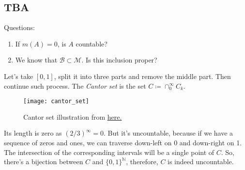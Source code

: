 \subsection{TBA}

Questions:
\begin{enumerate}
    \item {
        If $m(A) = 0$, is $A$ countable?
    }
    \item {
        We know that $\mathcal{B} \subset \mathcal{M}$. Is this inclusion proper?
    }
\end{enumerate}

\begin{definition}
    Let's take $[0, 1]$, split it into three parts and remove the middle part.
    Then continue such process.
    The \textit{Cantor set} is the set $C \coloneqq \cap_0^\infty C_k$.
\end{definition}

\begin{figure*}[h]
    \centering
    \texttt{[image: cantor\_set]}
    \caption*{Cantor set illustration from \href{http://tasks.illustrativemathematics.org/content-standards/tasks/929}{here.}}
\end{figure*}

\begin{remark}
    Its length is zero as $(2/3)^\infty = 0$. But it's uncountable,
    because if we have a sequence of zeros and ones, we can traverse 
    down-left on 0 and down-right on 1. The intersection of the corresponding
    intervals will be a single point of $C$. So, there's a bijection between
    $C$ and $\{0, 1\}^\mathbb{N}$, therefore, $C$ is indeed uncountable. 
\end{remark}
